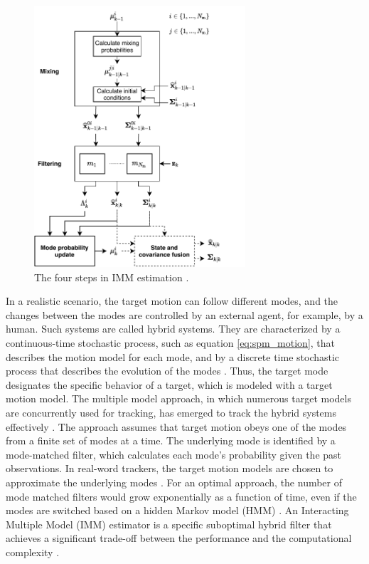 \documentclass[english, 12pt, a4paper, elec, utf8, a-1b, online]{aaltothesis}
\begin{document}
\begin{figure}[b]
    \centering
    \includegraphics[width=0.7\textwidth]{figures/IMM.pdf}
    \caption{
    The four steps in IMM estimation \cite{BarShalom2001}.}
    \label{fig:IMM}
\end{figure}

In a realistic scenario, the target motion can follow different modes, and the changes between the modes are controlled by an external agent, for example, by a human.
Such systems are called hybrid systems. 
They are characterized by a continuous-time stochastic process, such as equation \eqref{eq:spm_motion}, that describes the motion model for each mode, and by a discrete time stochastic process that describes the evolution of the modes \cite{BarShalom2001}.
Thus, the target mode designates the specific behavior of a target, which is modeled with a target motion model.
The multiple model approach, in which numerous target models are concurrently used for tracking, has emerged to track the hybrid systems effectively \cite{BarShalom2001}.
The approach assumes that target motion obeys one of the modes from a finite set of modes at a time.
The underlying mode is identified by a mode-matched filter, which calculates each mode's probability given the past observations.
In real-word trackers, the target motion models are chosen to approximate the underlying modes \cite{Simeonova2002}.
For an optimal approach, the number of mode matched filters would grow exponentially as a function of time, even if the modes are switched based on a hidden Markov model (HMM) \cite{BarShalom2001}.
An Interacting Multiple Model (IMM) estimator is a specific suboptimal hybrid filter that achieves a significant trade-off between the performance and the computational complexity \cite{BarShalom2001}.
\end{document}
